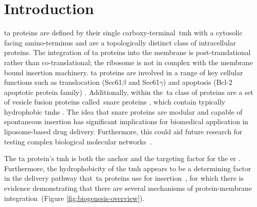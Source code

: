 \section{Introduction}

\gls{ta} proteins are defined by their single carboxy-terminal~\gls{tmh} with a cytosolic facing amino-terminus and are a topologically distinct class of intracellular proteins.
The integration of \gls{ta} proteins into the membrane is post\--translational rather than co-translational; the ribosome is not in complex with the membrane bound insertion machinery.
\gls{ta} proteins are involved in a range of key cellular functions such as translocation (Sec61$\beta$ and Sec61$\gamma$) \cite{Osborne2005} and apoptosis (Bcl-2 apoptotic protein family) \cite{Hockenbery1990}.
Additionally, within the~\gls{ta} class of proteins are a set of vesicle fusion proteins called~\gls{snare} proteins \cite{Ungar2003}, which contain typically hydrophobic \gls{tmh}s \cite{Kalbfleisch2007}.
The idea that \gls{snare} proteins are modular and capable of spontaneous insertion has significant implications for biomedical application in liposome\--based drug delivery.
Furthermore, this could aid future research for testing complex biological molecular networks~\cite{Allen2013, Nordlund2014}.

The \gls{ta} protein's \gls{tmh} is both the anchor and the targeting factor for the \gls{er} \cite{Kutay1993}.
Furthermore, the hydrophobicity of the \gls{tmh} appears to be a determining factor in the delivery pathway that~\gls{ta} proteins use for insertion~\cite{Rabu2008, Rabu2009}, for which there is evidence demonstrating that there are several mechanisms of protein\--membrane integration~\cite{Rabu2009, Johnson2013}(Figure \ref{fig:biogenesis-overview}).

